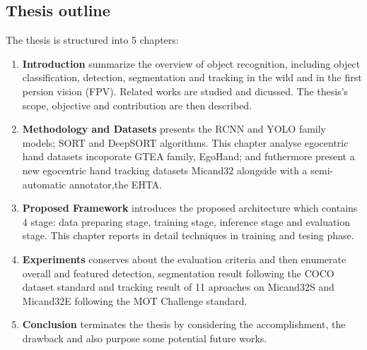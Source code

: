 \subsection{Thesis outline}
The thesis is structured into 5 chapters:
\begin{enumerate}
	\item \textbf{Introduction} summarize the overview of object recognition, including object classification, detection, segmentation and tracking in the wild and in the first persion vision (FPV). Related works are studied and dicussed. The thesis's scope, objective and contribution are then described.
	\item \textbf{Methodology and Datasets} presents the RCNN and YOLO family models; SORT and DeepSORT algorithms. This chapter analyse egocentric hand datasets incoporate GTEA family, EgoHand; and futhermore present a new egocentric hand tracking datasets Micand32 alongside with a semi-automatic annotator,the EHTA.
	\item \textbf{Proposed Framework} introduces the proposed architecture which contains 4 stage: data preparing stage, training stage, inference stage and evaluation stage. This chapter reports in detail techniques in training and tesing phase.
	\item \textbf{Experiments} conserves about the evaluation criteria and then enumerate overall and featured detection, segmentation result following the COCO dataset standard and tracking result of 11 aproaches on Micand32S and Micand32E following the MOT Challenge standard. 
	\item \textbf{Conclusion} terminates the thesis by considering the accomplishment, the drawback and also purpose some potential future works.
\end{enumerate}